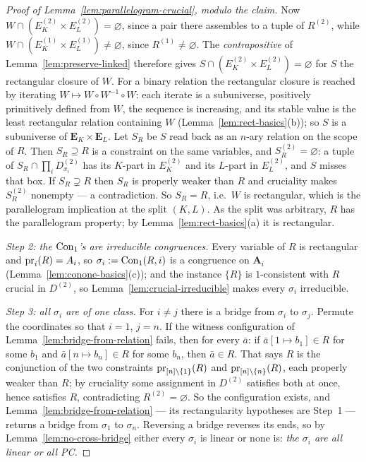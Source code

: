 \begin{proof}[Proof of Lemma~\ref{lem:parallelogram-crucial}, modulo the claim]
Now $W\cap(E_{K}^{(2)}\times E_{L}^{(2)})=\varnothing$, since a pair there
assembles to a tuple of $R^{(2)}$, while
$W\cap(E_{K}^{(1)}\times E_{L}^{(1)})\neq\varnothing$, since $R^{(1)}\neq
\varnothing$. The \emph{contrapositive} of Lemma~\ref{lem:preserve-linked}
therefore gives $S\cap(E_{K}^{(2)}\times E_{L}^{(2)})=\varnothing$ for $S$ the
rectangular closure of $W$. For a binary relation the rectangular closure is
reached by iterating $W\mapsto W\circ W^{-1}\circ W$: each iterate is a
subuniverse, positively primitively defined from $W$, the sequence is
increasing, and its stable value is the least rectangular relation containing
$W$ (Lemma~\ref{lem:rect-basics}(b)); so $S$ is a subuniverse of
$\mathbf E_{K}\times\mathbf E_{L}$. Let $S_{R}$ be $S$ read back as an
$n$-ary relation on the scope of $R$. Then $S_{R}\supseteq R$ is a constraint
on the same variables, and $S_{R}^{(2)}=\varnothing$: a tuple of
$S_{R}\cap\prod_{i}D^{(2)}_{x_{i}}$ has its $K$-part in $E_{K}^{(2)}$ and its
$L$-part in $E_{L}^{(2)}$, and $S$ misses that box. If $S_{R}\supsetneq R$
then $S_{R}$ is properly weaker than $R$ and cruciality makes
$S_{R}^{(2)}$ nonempty --- a contradiction. So $S_{R}=R$, i.e.\ $W$ is
rectangular, which is the parallelogram implication at the split $(K,L)$. As
the split was arbitrary, $R$ has the parallelogram property; by
Lemma~\ref{lem:rect-basics}(a) it is rectangular.

\emph{Step 2: the $\operatorname{Con}_1$'s are irreducible congruences.} Every variable of
$R$ is rectangular and $\operatorname*{pr}_{i}(R)=A_{i}$, so
$\sigma_{i}:=\operatorname{Con}_1(R,i)$ is a congruence on $\mathbf A_{i}$
(Lemma~\ref{lem:conone-basics}(c)); and the instance $\{R\}$ is $1$-consistent
with $R$ crucial in $D^{(2)}$, so Lemma~\ref{lem:crucial-irreducible} makes
every $\sigma_{i}$ irreducible.

\emph{Step 3: all $\sigma_{i}$ are of one class.} For $i\neq j$ there is a
bridge from $\sigma_{i}$ to $\sigma_{j}$. Permute the coordinates so that
$i=1$, $j=n$. If the witness configuration of
Lemma~\ref{lem:bridge-from-relation} fails, then for every $\bar a$: if
$\bar a[1\mapsto b_{1}]\in R$ for some $b_{1}$ and $\bar a[n\mapsto b_{n}]\in
R$ for some $b_{n}$, then $\bar a\in R$. That says $R$ is the conjunction of
the two constraints $\operatorname*{pr}_{[n]\setminus\{1\}}(R)$ and
$\operatorname*{pr}_{[n]\setminus\{n\}}(R)$, each properly weaker than $R$; by cruciality
some assignment in $D^{(2)}$ satisfies both at once, hence satisfies $R$,
contradicting $R^{(2)}=\varnothing$. So the configuration exists, and
Lemma~\ref{lem:bridge-from-relation} --- its rectangularity hypotheses are
Step~1 --- returns a bridge from $\sigma_{1}$ to $\sigma_{n}$. Reversing a
bridge reverses its ends, so by Lemma~\ref{lem:no-cross-bridge} either every
$\sigma_{i}$ is linear or none is: \emph{the $\sigma_{i}$ are all linear or
all PC.}


\end{proof}
